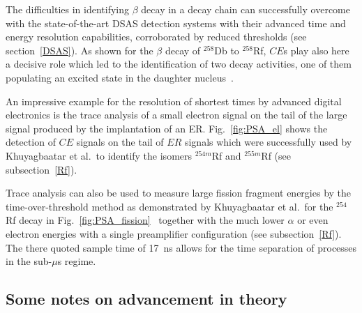 The difficulties in identifying $\beta$ decay in a decay chain can successfully overcome with the state-of-the-art DSAS detection systems with their advanced time and energy resolution capabilities, corroborated by reduced thresholds (see section~\ref{DSAS}). 
As shown for the $\beta$ decay of $^{258}$Db to $^{258}$Rf, $CE$s play also here a decisive role which led to the identification of two decay activities, one of them populating an excited state in the daughter nucleus~\cite{Hessberger2016a}.

An impressive example for the resolution of shortest times by advanced digital electronics is the trace analysis of a small electron signal on the tail of the large signal produced by the implantation of an ER. 
Fig.~\ref{fig:PSA_el} shows the detection of $CE$ signals on the tail of $ER$ signals which were successfully used by Khuyagbaatar et al.~to identify the isomers $^{254m}$Rf and $^{255m}$Rf (see subsection~\ref{Rf}).

Trace analysis can also be used to measure large fission fragment energies by the time-over-threshold method as demonstrated by Khuyagbaatar et al.~for the $^{254}$Rf decay in Fig.~\ref{fig:PSA_fission}~\cite{Khuyagbaatar2020b} together with the much lower $\alpha$ or even electron energies with a single preamplifier configuration (see subsection~\ref{Rf}).
The there quoted sample time of 17~ns allows for the time separation of processes in the sub-$\mu$s regime.

 \subsection{Some notes on advancement in theory}\label{theory}

